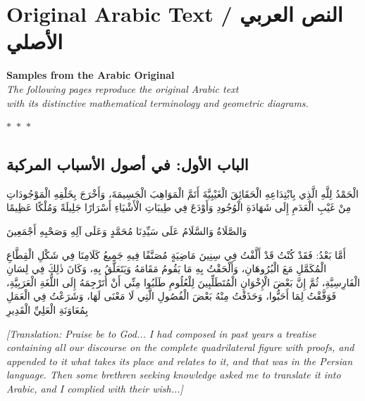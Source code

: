 \documentclass[11pt,a4paper]{article}
\theoremstyle{plain}
\theoremstyle{definition}
\theoremstyle{remark}
\newcommand{\ar}[1]{{\arabicfont\beginR #1\endR}}
\newcommand{\ornament}{\begin{center}\textcolor{goldaccent}{$\ast$~$\ast$~$\ast$}\end{center}}
\begin{document}
\section*{Original Arabic Text / \ar{النص العربي الأصلي}}

\begin{center}
\textcolor{sectioncolor}{\Large\textbf{Samples from the Arabic Original}}\\[0.3cm]
\textcolor{notecolor}{\textit{The following pages reproduce the original Arabic text}}\\
\textcolor{notecolor}{\textit{with its distinctive mathematical terminology and geometric diagrams.}}
\end{center}

\ornament

\subsection*{\ar{الباب الأول: في أصول الأسباب المركبة}}

\ar{الْحَمْدُ لِلَّهِ الَّذِي بِابْتِدَاعِهِ الْحَقَائِقَ الْغَيْبِيَّةَ أَتَمَّ الْمَوَاهِبَ الْجَسِيمَةَ، وَأَخْرَجَ بِخَلْقِهِ الْمَوْجُودَاتِ مِنْ غَيْبِ الْعَدَمِ إِلَى شَهَادَةِ الْوُجُودِ وَأَوْدَعَ فِي طِيبَاتِ الْأَشْيَاءِ أَسْرَارًا جَلِيلَةً وَمُلْكًا عَظِيمًا

وَالصَّلَاةُ وَالسَّلَامُ عَلَى سَيِّدِنَا مُحَمَّدٍ وَعَلَى آلِهِ وَصَحْبِهِ أَجْمَعِينَ

أَمَّا بَعْدُ: فَقَدْ كُنْتُ قَدْ أَلَّفْتُ فِي سِنِينَ مَاضِيَةٍ مُصَنَّفًا فِيهِ جَمِيعُ كَلَامِنَا فِي شَكْلِ الْقِطَّاعِ الْمُكَمَّلِ مَعَ الْبُرُوهَانِ، وَأَلْحَقْتُ بِهِ مَا يَقُومُ مَقَامَهُ وَيَتَعَلَّقُ بِهِ، وَكَانَ ذٰلِكَ فِي لِسَانِ الْفَارِسِيَّةِ، ثُمَّ إِنَّ بَعْضَ الْإِخْوَانِ الْمُتَطَلِّبِينَ لِلْعُلُومِ طَلَبُوا مِنِّي أَنْ أُتَرْجِمَهُ إِلَى اللُّغَةِ الْعَرَبِيَّةِ، فَوَفَّقْتُ لِمَا أَحَبُّوا، وَحَذَفْتُ مِنْهُ بَعْضَ الْفُصُولِ الَّتِي لَا مَعْنَى لَهَا، وَشَرَعْتُ فِي الْعَمَلِ بِمُعَاوَنَةِ الْعَلِيِّ الْقَدِيرِ}

\vspace{0.5cm}
\noindent\textcolor{notecolor}{\textit{[Translation: Praise be to God... I had composed in past years a treatise containing all our discourse on the complete quadrilateral figure with proofs, and appended to it what takes its place and relates to it, and that was in the Persian language. Then some brethren seeking knowledge asked me to translate it into Arabic, and I complied with their wish...]}}
\end{document}
